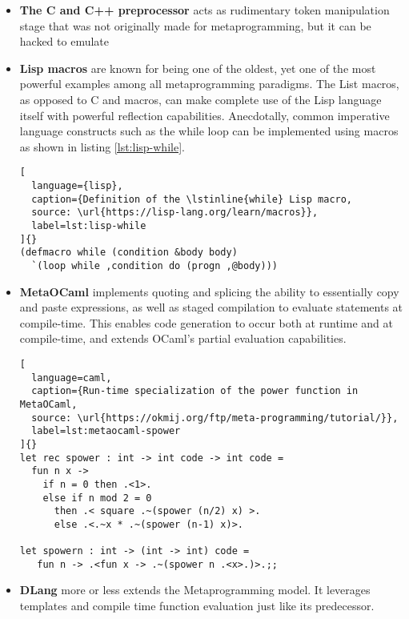 \documentclass[../main]{subfiles}
\begin{document}
\begin{itemize}
\item
\textbf{The C and C++ preprocessor} acts as rudimentary token manipulation stage
that was not originally made for metaprogramming, but it can be hacked
to emulate

\item
\textbf{Lisp macros}
are known for being one of the oldest, yet one of the most powerful
examples among all metaprogramming paradigms. The List macros, as opposed to
C and \cpp macros, can make complete use of the Lisp language itself
with powerful reflection capabilities.
Anecdotally, common imperative language constructs such as the while loop
can be implemented using macros as shown in listing \ref{lst:lisp-while}.

\begin{lstlisting}[
  language={lisp},
  caption={Definition of the \lstinline{while} Lisp macro,
  source: \url{https://lisp-lang.org/learn/macros}},
  label=lst:lisp-while
]{}
(defmacro while (condition &body body)
  `(loop while ,condition do (progn ,@body)))
\end{lstlisting}


\item
\textbf{MetaOCaml} \cite{metaocaml} implements quoting and splicing
\ie the ability to essentially copy and paste expressions,
as well as staged compilation to evaluate statements at compile-time.
This enables code generation to occur both at runtime and at compile-time,
and extends OCaml's partial evaluation capabilities.



\begin{lstlisting}[
  language=caml,
  caption={Run-time specialization of the power function in MetaOCaml,
  source: \url{https://okmij.org/ftp/meta-programming/tutorial/}},
  label=lst:metaocaml-spower
]{}
let rec spower : int -> int code -> int code =
  fun n x ->
    if n = 0 then .<1>.
    else if n mod 2 = 0
      then .< square .~(spower (n/2) x) >.
      else .<.~x * .~(spower (n-1) x)>.

let spowern : int -> (int -> int) code =
   fun n -> .<fun x -> .~(spower n .<x>.)>.;;
\end{lstlisting}

\item
\textbf{DLang} more or less extends the \cpp Metaprogramming model.
It leverages templates and compile time function evaluation just like
its predecessor.


\end{itemize}
\end{document}

